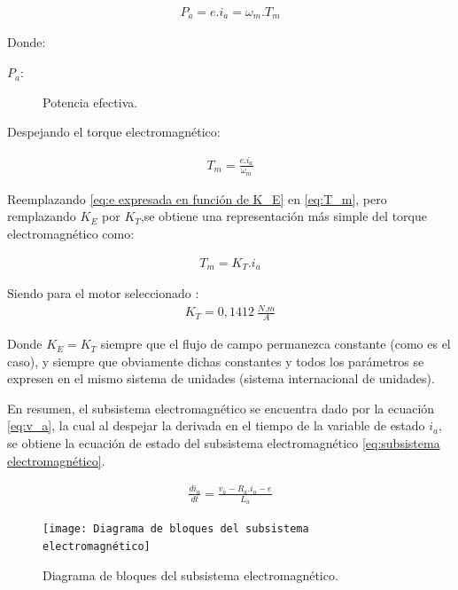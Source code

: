 \documentclass{article}
\begin{document}
\begin{sloppypar}
\begin{align}   \label{eq:P_a}
    P_a=e.i_a=\omega_m.T_m
\end{align}

Donde:
\begin{description}
	\item[$P_a:$] Potencia efectiva.
\end{description}

Despejando el torque electromagnético:

\begin{align}   \label{eq:T_m}
    T_m=\frac{e.i_a}{\omega_m}
\end{align}

Reemplazando \ref{eq:e expresada en función de K_E} en \ref{eq:T_m}, pero remplazando $K_E$ por $K_T$,se obtiene una representación más simple del torque electromagnético como:

\begin{align}   \label{eq:T_m expresada en función de K_T}
    T_m=K_T.i_a
\end{align}

Siendo para el motor seleccionado \cite{MoogMotorDatasheet}:
\begin{align}   \label{eq:Valor de K_T}
    K_T=0,1412\ \frac{N.m}{A}
\end{align}

Donde $K_E=K_T$ siempre que el flujo de campo permanezca constante (como es el caso), y siempre que obviamente dichas constantes y todos los parámetros se expresen en el mismo sistema de unidades (sistema internacional de unidades).

En resumen, el subsistema electromagnético se encuentra dado por la ecuación \ref{eq:v_a}, la cual al despejar la derivada en el tiempo de la variable de estado $i_a$, se obtiene la ecuación de estado del subsistema electromagnético \ref{eq:subsistema electromagnético}. 

\begin{align}   \label{eq:subsistema electromagnético}
    \frac{di_a}{dt}=\frac{v_a-R_a.i_a-e}{L_a}
\end{align}



\begin{figure}[H]
    \centering
    \texttt{[image: Diagrama de bloques del subsistema electromagnético]}
    \caption{Diagrama de bloques del subsistema electromagnético.}
    \label{fig:Diagrama de bloques del subsistema electromagnético}
\end{figure}


\end{sloppypar}
\end{document}
